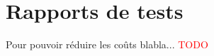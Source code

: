\documentclass[11pt,letterpaper]{article}
\begin{document}



\section{Rapports de tests}






Pour pouvoir réduire les coûts blabla... \textcolor{red}{TODO}
\end{document}
